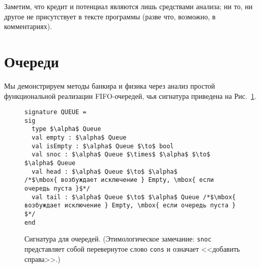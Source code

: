 Заметим, что кредит и потенциал являются лишь средствами анализа; ни
то, ни другое не присутствует в тексте программы (разве что, возможно,
в комментариях).

\section{Очереди}
\label{sc:5.2}

Мы демонстрируем методы банкира и физика через анализ простой
функциональной реализации FIFO-очередей, чья сигнатура приведена на
Рис.~\ref{fig:5.1}.

\begin{figure}

  \centering
\begin{lstlisting}
signature QUEUE =
sig
  type $\alpha$ Queue
  val empty : $\alpha$ Queue
  val isEmpty : $\alpha$ Queue $\to$ bool
  val snoc : $\alpha$ Queue $\times$ $\alpha$ $\to$ $\alpha$ Queue
  val head : $\alpha$ Queue $\to$ $\alpha$            /*$\mbox{ возбуждает исключение } Empty, \mbox{ если очередь пуста }$*/
  val tail : $\alpha$ Queue $\to$ $\alpha$ Queue /*$\mbox{ возбуждает исключение } Empty, \mbox{ если очередь пуста } $*/
end
\end{lstlisting}

  \caption{Сигнатура для очередей. (Этимологическое замечание:
    \lstinline!snoc! представляет собой перевернутое слово
    \lstinline!cons! и означает <<добавить справа>>.)}
  \label{fig:5.1}
\end{figure}

